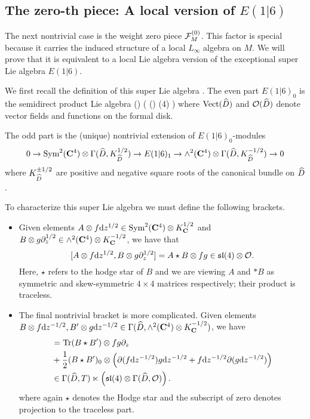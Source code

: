 \documentclass[../main.tex]{subfiles}
\begin{document}
\subsection{The zero-th piece: A local version of $E(1|6)$}
\parsec[] The next nontrivial case is the weight zero piece $\mathcal F^{(0)}_M$. 
This factor is special because it carries the induced structure of a local $L_\infty$ algebra on $M$. 
We will prove that it is equivalent to a local Lie algebra version of the exceptional super Lie algebra $E(1|6)$. 

We first recall the definition of this super Lie algebra \cite{KacBible}. 
The even part $E(1|6)_0$ is the semidirect product Lie algebra 
\beqn
\Vect() \ltimes \left( \cO() \otimes {}(4) \right )
\eeqn
where $\Vect(\Hat{D})$ and $\cO(\Hat{D})$ denote vector fields and functions on the formal disk.

The odd part is the (unique) nontrivial extension of $E(1|6)_0$-modules 
\[0\to \Sym^2 (\C^4)\otimes \Gamma(\Hat{D}, K^{1/2}_{\Hat{D}}) \to E(1|6)_1 \to \wedge^2 (\C^4) \otimes \Gamma(\Hat{D}, K^{-1/2}_{\Hat{D}}) \to 0 
\]
where $K^{\pm 1/2}_{\Hat{D}}$ are positive and negative square roots of the canonical bundle on $\Hat{D}$.

To characterize this super Lie algebra we must define the following brackets.
\begin{itemize}
\item Given elements $A \otimes f \mathrm{d} z^{1/2}\in \text{Sym}^2 (\mathbf{C}^4)\otimes K^{1/2}_{\mathbf{C}}$ and $B\otimes g \partial_z^{1/2}\in \wedge^2 (\mathbf{C}^4)\otimes K^{-1/2}_{\mathbf{C}}$, we have that
\[
[A \otimes f \mathrm{d} z^{1/2}, B\otimes g \partial_z^{1/2}] = A \star B \otimes fg \in \mathfrak{sl}(4)\otimes \mathcal{O}.
\]
Here, $\star$ refers to the hodge star of $B$ and we are viewing $A$ and $*B$ as symmetric and skew-symmetric $4\times 4$ matrices respectively; their product is traceless. 

\item The final nontrivial bracket is more complicated. 
Given elements $B \otimes f \mathrm{d} z^{-1/2}, B'\otimes g \mathrm{d} z^{-1/2} \in \Gamma( \widehat D, \wedge^2 (\mathbf{C}^4) \otimes K^{-1/2}_{\mathbf{C}})$, we have
\begin{align*}
[B\otimes f \d z^{-1/2} , B' \otimes g \d z^{-1/2} ] & = \tr (B \star B') \otimes fg \del_z \\ & + \frac12 (B \star B')_0 \otimes \left (\del (f \d z^{-1/2} ) g \d z^{-1/2} + f \d z^{-1/2} \del (g \d z^{-1/2} ) \right ) \\
& \in \Gamma (\hat D, T) \ltimes \left (\mf {sl}(4) \otimes \Gamma (\hat D, \mc O) \right ) .
\end{align*}
where again $\star$ denotes the Hodge star and the subscript of zero denotes projection to the traceless part. 
\end{itemize}
\end{document}
